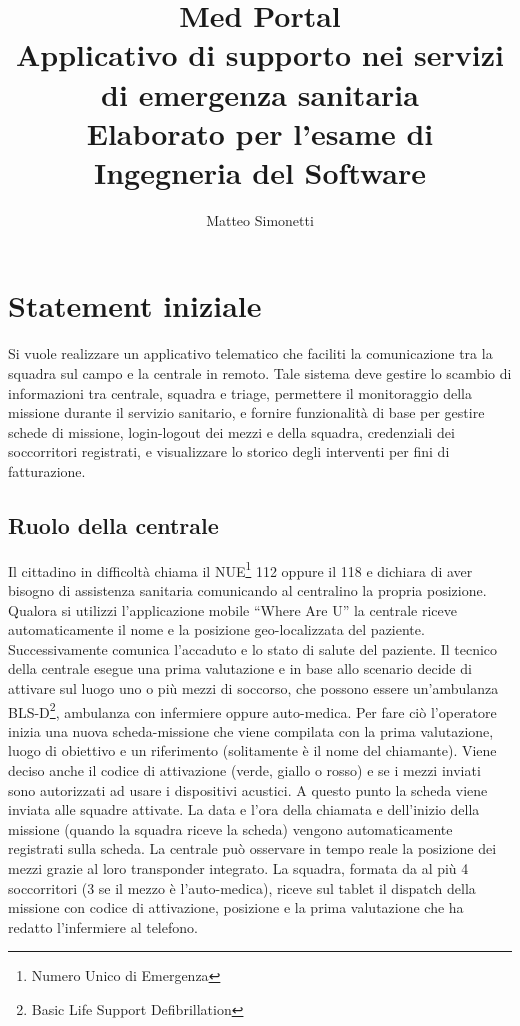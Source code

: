 \documentclass{article}
\title{Med Portal \\
        Applicativo di supporto nei servizi di emergenza sanitaria
        \\ \large Elaborato per l'esame di Ingegneria del Software}
\author{Matteo Simonetti}
\date{}
\begin{document}
    \maketitle
    \tableofcontents

    \newpage

    \section{Statement iniziale}

    Si vuole realizzare un applicativo telematico che faciliti la comunicazione tra la squadra sul campo e la centrale in remoto. Tale sistema deve gestire lo scambio di informazioni tra centrale, squadra e triage, permettere il monitoraggio della missione durante il servizio sanitario, e fornire funzionalità di base per gestire schede di missione, login-logout dei mezzi e della squadra, credenziali dei soccorritori registrati, e visualizzare lo storico degli interventi per fini di fatturazione.

    \subsection{Ruolo della centrale}
    Il cittadino in difficoltà chiama il NUE\footnote{Numero Unico di Emergenza} 112 oppure il 118 e dichiara di aver bisogno di assistenza sanitaria comunicando al centralino la propria posizione. Qualora si utilizzi l’applicazione mobile “Where Are U” la centrale riceve automaticamente il nome e la posizione geo-localizzata del paziente. Successivamente comunica l’accaduto e lo stato di salute del paziente.
    Il tecnico della centrale esegue una prima valutazione e in base allo scenario decide di attivare sul luogo uno o più mezzi di soccorso, che possono essere un’ambulanza BLS-D\footnote{Basic Life Support Defibrillation}, ambulanza con infermiere oppure auto-medica. Per fare ciò l’operatore inizia una nuova scheda-missione che viene compilata con la prima valutazione, luogo di obiettivo e un riferimento (solitamente è il nome del chiamante). Viene deciso anche il codice di attivazione (verde, giallo o rosso) e se i mezzi inviati sono autorizzati ad usare i dispositivi acustici.
    A questo punto la scheda viene inviata alle squadre attivate.
    La data e l’ora della chiamata e dell’inizio della missione (quando la squadra riceve la scheda) vengono automaticamente registrati sulla scheda.
    La centrale può osservare in tempo reale la posizione dei mezzi grazie al loro transponder integrato.
    La squadra, formata da al più 4 soccorritori (3 se il mezzo è l’auto-medica), riceve sul tablet il dispatch della missione con codice di attivazione, posizione e la prima valutazione che ha redatto l’infermiere al telefono.
\end{document}
